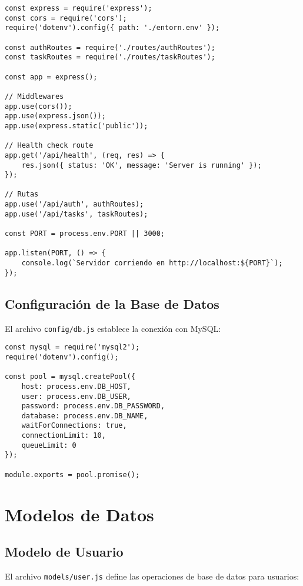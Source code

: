 \documentclass[12pt,a4paper]{article}
\begin{document}
\begin{lstlisting}
const express = require('express');
const cors = require('cors');
require('dotenv').config({ path: './entorn.env' });

const authRoutes = require('./routes/authRoutes');
const taskRoutes = require('./routes/taskRoutes');

const app = express();

// Middlewares
app.use(cors());
app.use(express.json());
app.use(express.static('public'));

// Health check route
app.get('/api/health', (req, res) => {
    res.json({ status: 'OK', message: 'Server is running' });
});

// Rutas
app.use('/api/auth', authRoutes);
app.use('/api/tasks', taskRoutes);

const PORT = process.env.PORT || 3000;

app.listen(PORT, () => {
    console.log(`Servidor corriendo en http://localhost:${PORT}`);
});
\end{lstlisting}

\subsection{Configuración de la Base de Datos}

El archivo \texttt{config/db.js} establece la conexión con MySQL:

\begin{lstlisting}
const mysql = require('mysql2');
require('dotenv').config();

const pool = mysql.createPool({
    host: process.env.DB_HOST,
    user: process.env.DB_USER,
    password: process.env.DB_PASSWORD,
    database: process.env.DB_NAME,
    waitForConnections: true,
    connectionLimit: 10,
    queueLimit: 0
});

module.exports = pool.promise();
\end{lstlisting}

\section{Modelos de Datos}

\subsection{Modelo de Usuario}

El archivo \texttt{models/user.js} define las operaciones de base de datos para usuarios:
\end{document}
